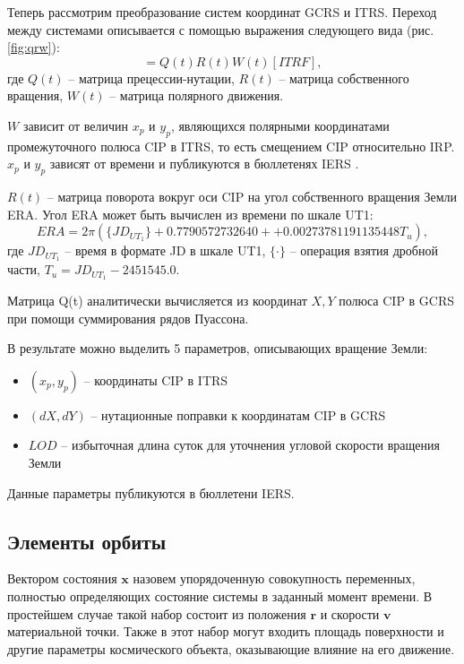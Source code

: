 Теперь рассмотрим преобразование систем координат GCRS и ITRS.
Переход между системами описывается с помощью выражения следующего вида (рис. \ref{fig:qrw}):
\begin{equation*}
    [GCRF] = Q(t) R(t) W (t) [ITRF],
\end{equation*}
где $Q(t)$ -- матрица прецессии-нутации, $R(t)$ -- матрица собственного вращения, 
$W(t)$ -- матрица полярного движения.

$W$ зависит от величин $x_p$ и $y_p$, являющихся полярными координатами промежуточного
полюса CIP в ITRS, то есть смещением CIP относительно IRP. $x_p$ и $y_p$ зависят от времени
и публикуются в бюллетенях IERS \cite{Petit2010}.

$R(t)$ -- матрица поворота вокруг оси CIP на угол собственного вращения Земли ERA.
Угол ERA может быть вычислен из времени по шкале UT1:
\begin{equation*}
    ERA = 2 \pi (\{JD_{UT_1}\} + 0.7790572732640 + + 0.00273781191135448 T_u),
\end{equation*}
где $JD_{UT_1}$ -- время в формате JD в шкале UT1, $\{\cdot\}$ -- операция взятия дробной части,
$T_u = JD_{UT_1} - 2451545.0$.

Матрица Q(t) аналитически вычисляется из координат $X, Y$ полюса CIP в GCRS при помощи
суммирования рядов Пуассона.

В результате можно выделить 5 параметров, описывающих вращение Земли:
\begin{itemize}
    \item $(x_p, y_p)$ -- координаты CIP в ITRS
    \item $(dX, dY)$ -- нутационные поправки к координатам CIP в GCRS
    \item $LOD$ -- избыточная длина суток для уточнения угловой скорости вращения Земли
\end{itemize}

Данные параметры публикуются в бюллетени IERS.

\subsection{Элементы орбиты}
Вектором состояния $\mathbf{x}$ назовем упорядоченную совокупность переменных, полностью определяющих состояние системы в заданный момент времени.
В простейшем случае такой набор состоит из положения $\mathbf{r}$ и скорости $\mathbf{v}$ материальной точки. 
Также в этот набор могут входить площадь поверхности и другие параметры космического объекта, оказывающие влияние на его движение.

